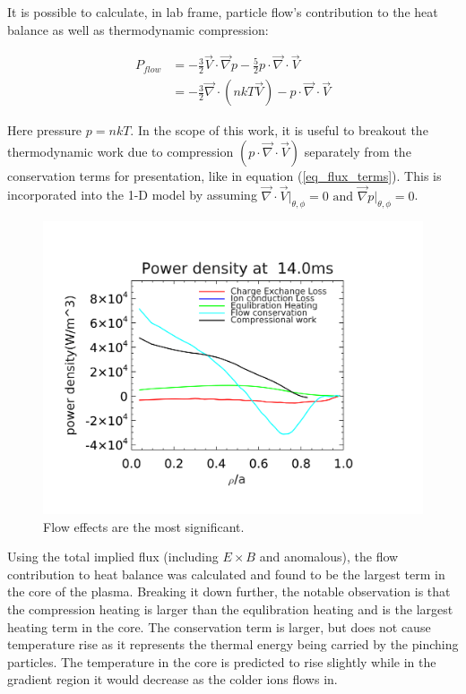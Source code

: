 \documentclass[aip, pop, preprint]{revtex4-1}
\begin{document}
It is possible to calculate, in lab frame, particle flow's contribution to the heat balance as well as thermodynamic compression:

\begin{align}
P_{flow} & = -\frac{3}{2}\vec{V}\cdot\vec{\nabla}p - \frac{5}{2}p\cdot\vec{\nabla}\cdot\vec{V}\\
& = -\frac{3}{2}\vec{\nabla}\cdot(nkT\vec{V}) - p\cdot\vec{\nabla}\cdot\vec{V}\label{eq_flux_terms}
\end{align} 

Here pressure $ p = nkT $. In the scope of this work, it is useful to breakout the thermodynamic work due to compression $  ( p\cdot\vec{\nabla}\cdot\vec{V} ) $ separately from the conservation terms for presentation, like in equation (\ref{eq_flux_terms}). This is incorporated into the 1-D model by assuming $ \vec{\nabla}\cdot\vec{V}\vert_{\theta, \phi} = 0 \text{ and } \vec{\nabla}p\vert_{\theta, \phi} = 0 $.


\begin{figure}
	\centering
	\includegraphics[width=1.\columnwidth]{./plots/dedt_june18-1.png}
	\caption{Flow effects are the most significant.\label{fig:dedt_plot}}
\end{figure}

Using the total implied flux (including $ E \times B $ and anomalous), the flow contribution to heat balance was calculated and found to be the largest term in the core of the plasma. Breaking it down further, the notable observation is that the compression heating is larger than the equlibration heating and is the largest heating term in the core. The conservation term is larger, but does not cause temperature rise as it represents the thermal energy being carried by the pinching particles. The temperature in the core is predicted to rise slightly while in the gradient region it would decrease as the colder ions flows in.
\end{document}

